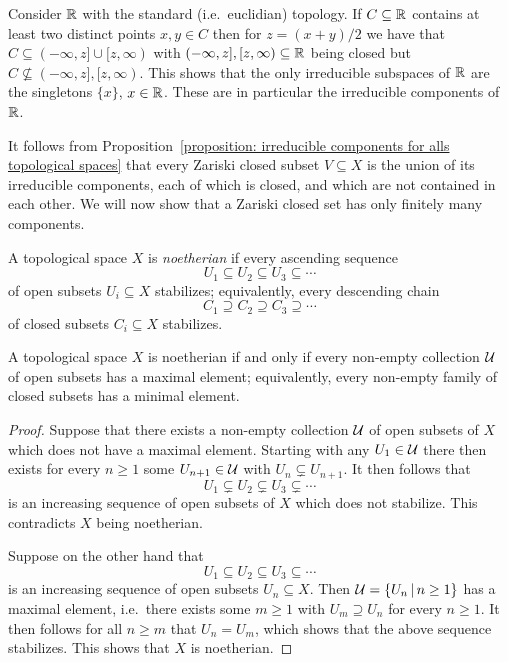 \begin{example}
  Consider $\mathbb{R}$ with the standard (i.e.\ euclidian) topology.
  If $C \subseteq \mathbb{R}$ contains at least two distinct points $x, y \in C$ then for $z =  (x+y)/2$ we have that $C \subseteq (-\infty,z] \cup [z,\infty)$ with $(-\infty,z], [z,\infty) \subseteq \mathbb{R}$ being closed but $C \nsubseteq (-\infty,z], [z,\infty)$.
  This shows that the only irreducible subspaces of $\mathbb{R}$ are the singletons $\{x\}$, $x \in \mathbb{R}$.
  These are in particular the irreducible components of $\mathbb{R}$.
\end{example}




\begin{fluff}
  It follows from Proposition~\ref{proposition: irreducible components for alls topological spaces} that every Zariski closed subset $V \subseteq X$ is the union of its irreducible components, each of which is closed, and which are not contained in each other.
  We will now show that a Zariski closed set has only finitely many components.
\end{fluff}


\begin{definition}
  A topological space $X$ is \emph{noetherian} if every ascending sequence
  \[
              U_1
    \subseteq U_2
    \subseteq U_3
    \subseteq \dotsb
  \]
  of open subsets $U_i \subseteq X$ stabilizes;
  equivalently, every descending chain
  \[
              C_1
    \supseteq C_2
    \supseteq C_3
    \supseteq \dotsb
  \]
  of closed subsets $C_i \subseteq X$ stabilizes.
\end{definition}


\begin{lemma}
  \label{lemma: noetherian via max min elements of collections}
  A topological space $X$ is noetherian if and only if every non-empty collection $\mathcal{U}$ of open subsets has a maximal element;
  equivalently, every non-empty family of closed subsets has a minimal element.
\end{lemma}


\begin{proof}
  Suppose that there exists a non-empty collection $\mathcal{U}$ of open subsets of $X$ which does not have a maximal element.
  Starting with any $U_1 \in \mathcal{U}$ there then exists for every $n \geq 1$ some $U_{n+1} \in \mathcal{U}$ with $U_n \subsetneq U_{n+1}$.
  It then follows that
  \[
                U_1
    \subsetneq  U_2
    \subsetneq  U_3
    \subsetneq  \dotsb
  \]
  is an increasing sequence of open subsets of $X$ which does not stabilize.
  This contradicts $X$ being noetherian.
  
  Suppose on the other hand that
  \[
              U_1
    \subseteq U_2
    \subseteq U_3
    \subseteq \dotsb
  \]
  is an increasing sequence of open subsets $U_n \subseteq X$.
  Then $\mc{U} = \{U_n \suchthat n \geq 1\}$ has a maximal element, i.e.\ there exists some $m \geq 1$ with $U_m \supseteq U_n$ for every $n \geq 1$.
  It then follows for all $n \geq m$ that $U_n = U_m$, which shows that the above sequence stabilizes.
  This shows that $X$ is noetherian.
\end{proof}


